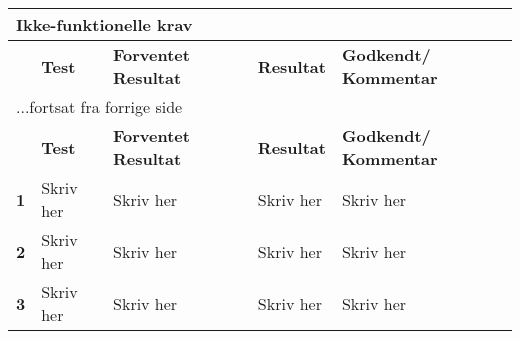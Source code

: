 \begin{center}
\label{accepttest:ikkefunktionellekrav} 
\begin{longtable}{|p{}|p{}|p{}|p{}|p{}|} %
\hline
\multicolumn{5}{|l|}{\textbf{Ikke-funktionelle krav}} \\ \hline
\multicolumn{1}{|c|}{} &
\textbf{Test} &
\textbf{Forventet \newline Resultat} &
\textbf{Resultat} &
\textbf{Godkendt/ \newline Kommentar} \\ \hline 
\endfirsthead

\multicolumn{5}{l}{...fortsat fra forrige side} \\ \hline 
\multicolumn{1}{|c|}{} &
\textbf{Test} &
\textbf{Forventet \newline Resultat} &
\textbf{Resultat} &
\textbf{Godkendt/ \newline Kommentar} \\ \hline 
\endhead



\textbf{1}	&Skriv her
			&Skriv her
			&Skriv her
			&Skriv her 
			\\\hline

\textbf{2}	&Skriv her
			&Skriv her
			&Skriv her
			&Skriv her 
			\\\hline
			 
\textbf{3}	&Skriv her
			&Skriv her
			&Skriv her
			&Skriv her
			\\\hline

\end{longtable}
\end{center}


